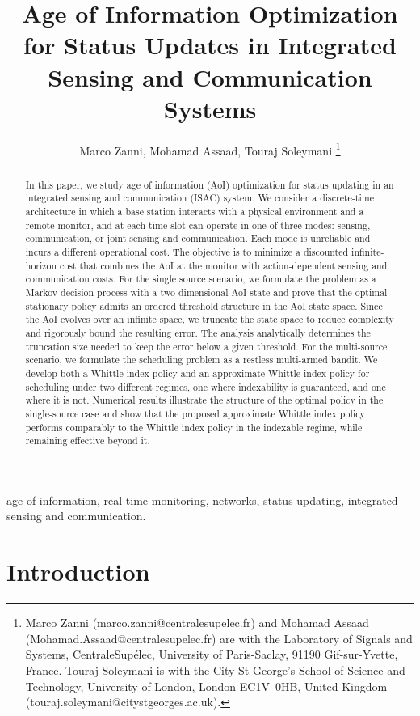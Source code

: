 \documentclass[letterpaper,journal]{IEEEtran}
\title{Age of Information Optimization for Status Updates in Integrated Sensing and Communication Systems}
\author{Marco Zanni, Mohamad Assaad, Touraj Soleymani
\thanks{Marco Zanni (marco.zanni@centralesupelec.fr) and Mohamad Assaad (Mohamad.Assaad@centralesupelec.fr) are with the Laboratory of Signals and Systems, CentraleSup\'{e}lec, University of Paris-Saclay, 91190 Gif-sur-Yvette, France. Touraj Soleymani is with the City St George's School of Science and Technology, University of London, London EC1V~0HB, United Kingdom (touraj.soleymani@citystgeorges.ac.uk).}%
}
\begin{document}
\maketitle

\begin{abstract}
In this paper, we study age of information (AoI) optimization for status updating in an integrated sensing and communication (ISAC) system. We consider a discrete-time architecture in which a base station interacts with a physical environment and a remote monitor, and at each time slot can operate in one of three modes: sensing, communication, or joint sensing and communication. Each mode is unreliable and incurs a different operational cost. The objective is to minimize a discounted infinite-horizon cost that combines the AoI at the monitor with action-dependent sensing and communication costs.
For the single source scenario, we formulate the problem as a Markov decision process with a two-dimensional AoI state and prove that the optimal stationary policy admits an ordered threshold structure in the AoI state space. Since the AoI evolves over an infinite space, we truncate the state space to reduce complexity and rigorously bound the resulting error. The analysis analytically determines the truncation size needed to keep the error below a given threshold. For the multi-source scenario, we formulate the scheduling problem as a restless multi-armed bandit. We develop both a Whittle index policy and an approximate Whittle index policy for scheduling under two different regimes, one where indexability is guaranteed, and one where it is not.
Numerical results illustrate the structure of the optimal policy in the single-source case and show that the proposed approximate Whittle index policy performs comparably to the Whittle index policy in the indexable regime, while remaining effective beyond it.

\end{abstract}

\begin{IEEEkeywords}
age of information, real-time monitoring, networks, status updating, integrated sensing and communication.
\end{IEEEkeywords}


\section{Introduction}\label{sec:introduction}
\end{document}
